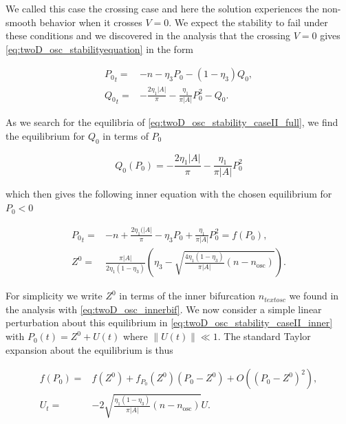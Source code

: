 We called this case the crossing case and here the solution experiences the non-smooth behavior when it crosses $V=0$. We expect the stability to fail under these conditions and we discovered in the analysis that the crossing $V=0$ gives \eqref{eq:twoD_osc_stabilityequation} in the form

\begin{equation}\label{eq:twoD_osc_stability_caseII_full}
\begin{aligned}
{P_0}_t =& -n-\eta_3 P_0-(1-\eta_3)Q_0,\\
{Q_0}_t =& -\frac{2\eta_1|A|}{\pi}-\frac{\eta_1}{\pi |A|}P_0^2-Q_0.
\end{aligned}
\end{equation}

As we search for the equilibria of \eqref{eq:twoD_osc_stability_caseII_full}, we find the equilibrium for $Q_0$ in terms of $P_0$ 

\begin{equation*}
Q_0(P_0)=-\frac{2\eta_1|A|}{\pi}-\frac{\eta_1}{\pi |A|}P_0^2
\end{equation*}

which then gives the following inner equation with the chosen equilibrium for $P_0<0$

\begin{equation}\label{eq:twoD_osc_stability_caseII_inner}
\begin{aligned}
{P_0}_t=&-n+\frac{2\eta_1(|A|}{\pi}-\eta_3 P_0+\frac{\eta_1}{\pi |A|}P_0^2=f(P_0),\\
Z^0=&\frac{\pi |A|}{2\eta_1(1-\eta_3)}\left(\eta_3-\sqrt{\frac{4\eta_1(1-\eta_3)}{\pi|A|}(n-n_{\text{osc}})}\right).
\end{aligned}
\end{equation}

For simplicity we write $Z^0$ in terms of the inner bifurcation $n_{text{osc}}$ we found in the analysis with \eqref{eq:twoD_osc_innerbif}. We now consider a simple linear perturbation about this equilibrium in \eqref{eq:twoD_osc_stability_caseII_inner} with $P_0(t)=Z^0+U(t)$ where $\lVert U(t)\rVert\ll 1$. The standard Taylor expansion about the equilibrium is thus

\begin{equation}\label{eqLtwoD_osc_stability_caseII_perturb}
\begin{aligned}
f(P_0)=&f(Z^0)+f_{P_0}(Z^0)(P_0-Z^0)+O((P_0-Z^0)^2),\\
U_t=&- 2\sqrt{\frac{\eta_1(1-\eta_3)}{\pi|A|}(n-n_{\text{osc}})}U.
\end{aligned}
\end{equation}

